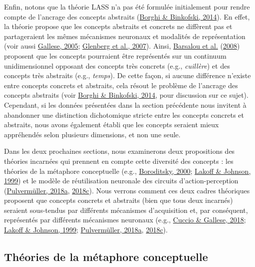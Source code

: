 \documentclass[
  a4paper,12pt,twoside,onecolumn,openright,final,oldfontcommands]{memoir}
\begin{document}
Enfin, notons que la théorie LASS n'a pas été formulée initialement pour rendre compte de l'ancrage des concepts abstraits (\protect\hyperlink{ref-borghi_words_2014}{Borghi \& Binkofski, 2014}). En effet, la théorie propose que les concepts abstraits et concrets ne diffèrent pas et partageraient les mêmes mécanismes neuronaux et modalités de représentation (voir aussi \protect\hyperlink{ref-gallese_embodied_2005}{Gallese, 2005}; \protect\hyperlink{ref-glenberg_what_2007}{Glenberg et al., 2007}). Ainsi, \protect\hyperlink{ref-barsalou_language_2008}{Barsalou et al.} (\protect\hyperlink{ref-barsalou_language_2008}{2008}) proposent que les concepts pourraient être représentés sur un continuum unidimensionnel opposant des concepts très concrets (e.g., \emph{cuillère}) et des concepts très abstraits (e.g., \emph{temps}). De cette façon, si aucune différence n'existe entre concepts concrets et abstraits, cela résout le problème de l'ancrage des concepts abstraits (voir \protect\hyperlink{ref-borghi_words_2014}{Borghi \& Binkofski, 2014}, pour discussion sur ce sujet). Cependant, si les données présentées dans la section précédente nous invitent à abandonner une distinction dichotomique stricte entre les concepts concrets et abstraits, nous avons également établi que les concepts seraient mieux appréhendés selon plusieurs dimensions, et non une seule.

Dans les deux prochaines sections, nous examinerons deux propositions des théories incarnées qui prennent en compte cette diversité des concepts : les théories de la métaphore conceptuelle (e.g., \protect\hyperlink{ref-boroditsky_metaphoric_2000}{Boroditsky, 2000}; \protect\hyperlink{ref-lakoff_philosophy_1999}{Lakoff \& Johnson, 1999}) et le modèle de réutilisation neuronale des circuits d'action-perception (\protect\hyperlink{ref-pulvermuller_neural_2018}{Pulvermüller, 2018a}, \protect\hyperlink{ref-pulvermuller_case_2018}{2018c}). Nous verrons comment ces deux cadres théoriques proposent que concepts concrets et abstraits (bien que tous deux incarnés) seraient sous-tendus par différents mécanismes d'acquisition et, par conséquent, représentés par différents mécanismes neuronaux (e.g., \protect\hyperlink{ref-cuccio_peircean_2018}{Cuccio \& Gallese, 2018}; \protect\hyperlink{ref-lakoff_philosophy_1999}{Lakoff \& Johnson, 1999}; \protect\hyperlink{ref-pulvermuller_neural_2018}{Pulvermüller, 2018a}, \protect\hyperlink{ref-pulvermuller_case_2018}{2018c}).

\hypertarget{thuxe9ories-de-la-muxe9taphore-conceptuelle}{%
\subsection{Théories de la métaphore conceptuelle}\label{thuxe9ories-de-la-muxe9taphore-conceptuelle}}
\end{document}
